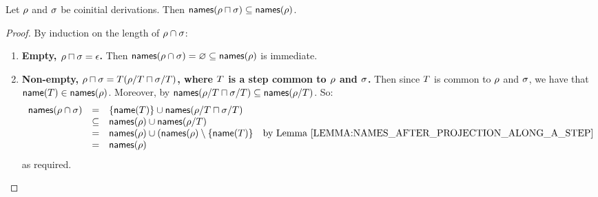\begin{lemma}
Let $\rho$ and $\sigma$ be coinitial derivations.
Then $\mathsf{names}(\rho \sqcap \sigma) \subseteq \mathsf{names}(\rho)$.
\end{lemma}
\begin{proof}
By induction on the length of $\rho \cap \sigma$:
\begin{enumerate}
\item {\bf Empty, $\rho \sqcap \sigma = \epsilon$.}
      Then $\mathsf{names}(\rho \cap \sigma) = \varnothing \subseteq \mathsf{names}(\rho)$ is immediate.
\item {\bf Non-empty, $\rho \sqcap \sigma = T(\rho/T \sqcap \sigma/T)$,
           where $T$ is a step common to $\rho$ and $\sigma$.}
      Then since $T$ is common to $\rho$ and $\sigma$,
      we have that $\mathsf{name}(T) \in \mathsf{names}(\rho)$.
      Moreover, by \ih $\mathsf{names}(\rho/T \sqcap \sigma/T) \subseteq \mathsf{names}(\rho/T)$.
      So:
      \[
        \begin{array}{rcll}
        \names(\redseq \cap \redseqtwo) & = & \set{\name(\redexthree)} \cup \names(\redseq/\redexthree \sqcap \redseqtwo/\redexthree) \\
                                        & \subseteq & \names(\redseq) \cup \names(\redseq/\redexthree) \\
                                        & = & \names(\redseq) \cup (\names(\redseq) \setminus \set{\name(\redexthree)} & \text{by \rlem{names_after_projection_along_a_step}} \\
                                        & = & \names(\redseq)
        \end{array}
      \]
      as required.
\end{enumerate}
\end{proof}

